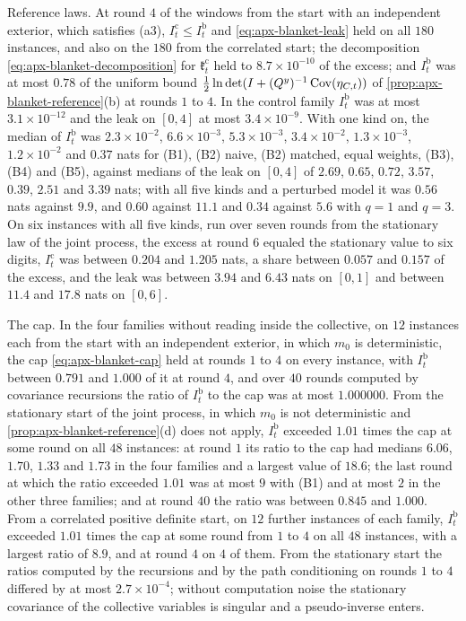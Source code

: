 \begin{numcheck}
Reference laws. At round $4$ of the windows from the start with an independent exterior, which satisfies (a3), $I^{\mathrm c}_t\le I^{\mathrm b}_t$ and \eqref{eq:apx-blanket-leak} held on all $180$ instances, and also on the $180$ from the correlated start; the decomposition \eqref{eq:apx-blanket-decomposition} for $\mathfrak k^{\mathrm c}_t$ held to $8.7\times10^{-10}$ of the excess; and $I^{\mathrm b}_t$ was at most $0.78$ of the uniform bound $\frac12\ln\det(I+(Q^y)^{-1}\operatorname{Cov}(\eta_{C,t}))$ of \cref{prop:apx-blanket-reference}(b) at rounds $1$ to $4$. In the control family $I^{\mathrm b}_t$ was at most $3.1\times10^{-12}$ and the leak on $[0,4]$ at most $3.4\times10^{-9}$. With one kind on, the median of $I^{\mathrm b}_t$ was $2.3\times10^{-2}$, $6.6\times10^{-3}$, $5.3\times10^{-3}$, $3.4\times10^{-2}$, $1.3\times10^{-3}$, $1.2\times10^{-2}$ and $0.37$ nats for (B1), (B2) naive, (B2) matched, equal weights, (B3), (B4) and (B5), against medians of the leak on $[0,4]$ of $2.69$, $0.65$, $0.72$, $3.57$, $0.39$, $2.51$ and $3.39$ nats; with all five kinds and a perturbed model it was $0.56$ nats against $9.9$, and $0.60$ against $11.1$ and $0.34$ against $5.6$ with $q=1$ and $q=3$. On six instances with all five kinds, run over seven rounds from the stationary law of the joint process, the excess at round $6$ equaled the stationary value to six digits, $I^{\mathrm c}_t$ was between $0.204$ and $1.205$ nats, a share between $0.057$ and $0.157$ of the excess, and the leak was between $3.94$ and $6.43$ nats on $[0,1]$ and between $11.4$ and $17.8$ nats on $[0,6]$.

The cap. In the four families without reading inside the collective, on $12$ instances each from the start with an independent exterior, in which $m_0$ is deterministic, the cap \eqref{eq:apx-blanket-cap} held at rounds $1$ to $4$ on every instance, with $I^{\mathrm b}_t$ between $0.791$ and $1.000$ of it at round $4$, and over $40$ rounds computed by covariance recursions the ratio of $I^{\mathrm b}_t$ to the cap was at most $1.000000$. From the stationary start of the joint process, in which $m_0$ is not deterministic and \cref{prop:apx-blanket-reference}(d) does not apply, $I^{\mathrm b}_t$ exceeded $1.01$ times the cap at some round on all $48$ instances: at round $1$ its ratio to the cap had medians $6.06$, $1.70$, $1.33$ and $1.73$ in the four families and a largest value of $18.6$; the last round at which the ratio exceeded $1.01$ was at most $9$ with (B1) and at most $2$ in the other three families; and at round $40$ the ratio was between $0.845$ and $1.000$. From a correlated positive definite start, on $12$ further instances of each family, $I^{\mathrm b}_t$ exceeded $1.01$ times the cap at some round from $1$ to $4$ on all $48$ instances, with a largest ratio of $8.9$, and at round $4$ on $4$ of them. From the stationary start the ratios computed by the recursions and by the path conditioning on rounds $1$ to $4$ differed by at most $2.7\times10^{-4}$; without computation noise the stationary covariance of the collective variables is singular and a pseudo-inverse enters.


\end{numcheck}
